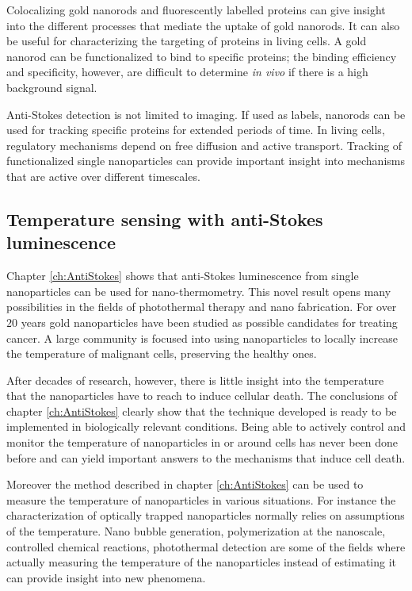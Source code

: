 Colocalizing gold nanorods and fluorescently labelled proteins can give insight
into the different processes that mediate the uptake of gold
nanorods\cite{Leduc2013}. It can also be useful for characterizing the targeting
of proteins in living cells. A gold nanorod can be functionalized to bind to
specific proteins\cite{Li2013a}; the binding efficiency and specificity,
however, are difficult to determine \textit{in vivo} if there is a high background
signal.

Anti-Stokes detection is not limited to imaging. If used as labels, nanorods can
be used for tracking\cite{Spillane2014} specific proteins for extended periods
of time. In living cells, regulatory mechanisms depend on free diffusion and
active transport\cite{Nowack2012}. Tracking of functionalized single
nanoparticles can provide important insight into mechanisms that are active over
different timescales\cite{Conde2013}.

\subsection{Temperature sensing with anti-Stokes luminescence}
Chapter \ref{ch:AntiStokes} shows that anti-Stokes luminescence from single
nanoparticles can be used for nano-thermometry. This novel result opens many
possibilities in the fields of photothermal therapy\cite{Hirsch2003} and nano
fabrication\cite{Fedoruk2013}. For over $20$ years gold nanoparticles have been
studied as possible candidates for treating cancer\cite{ONeal2004}. A large
community is focused into using nanoparticles to locally increase the temperature of malignant cells,
preserving the healthy ones.

After decades of research, however, there is little insight into the temperature
that the nanoparticles have to reach to induce cellular death\cite{Huang2006a}.
The conclusions of chapter \ref{ch:AntiStokes} clearly show that the technique
developed is ready to be implemented in biologically relevant conditions. Being
able to actively control and monitor the temperature of nanoparticles in or
around cells has never been done before and can yield important answers to the
mechanisms that induce cell death.

Moreover the method described in chapter \ref{ch:AntiStokes} can be used to
measure the temperature of nanoparticles in various situations. For instance the
characterization of optically trapped nanoparticles normally relies on
assumptions of the temperature\cite{Ruijgrok2011a}. Nano bubble
generation\cite{Hou2015}, polymerization at the nanoscale\cite{Ma2014a},
controlled chemical reactions\cite{Urban2009}, photothermal
detection\cite{Boyer2002} are some of the fields where actually measuring the
temperature of the nanoparticles instead of estimating it can provide insight
into new phenomena.

